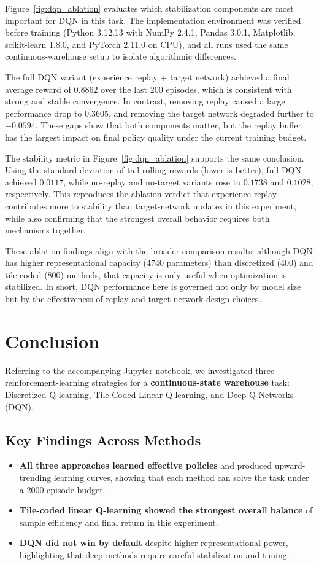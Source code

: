 \documentclass[10pt,twocolumn]{article}
\begin{document}
Figure~\ref{fig:dqn_ablation} evaluates which stabilization components are most important for DQN in this task. The implementation environment was verified before training (Python 3.12.13 with NumPy 2.4.1, Pandas 3.0.1, Matplotlib, scikit-learn 1.8.0, and PyTorch 2.11.0 on CPU), and all runs used the same continuous-warehouse setup to isolate algorithmic differences.

The full DQN variant (experience replay + target network) achieved a final average reward of $0.8862$ over the last 200 episodes, which is consistent with strong and stable convergence. In contrast, removing replay caused a large performance drop to $0.3605$, and removing the target network degraded further to $-0.0594$. These gaps show that both components matter, but the replay buffer has the largest impact on final policy quality under the current training budget.

The stability metric in Figure~\ref{fig:dqn_ablation} supports the same conclusion. Using the standard deviation of tail rolling rewards (lower is better), full DQN achieved $0.0117$, while no-replay and no-target variants rose to $0.1738$ and $0.1028$, respectively. This reproduces the ablation verdict that experience replay contributes more to stability than target-network updates in this experiment, while also confirming that the strongest overall behavior requires both mechanisms together.

These ablation findings align with the broader comparison results: although DQN has higher representational capacity (4740 parameters) than discretized (400) and tile-coded (800) methods, that capacity is only useful when optimization is stabilized. In short, DQN performance here is governed not only by model size but by the effectiveness of replay and target-network design choices.

\section{Conclusion}

Referring to the accompanying Jupyter notebook, we investigated three reinforcement-learning strategies for a \textbf{continuous-state warehouse} task: Discretized Q-learning, Tile-Coded Linear Q-learning, and Deep Q-Networks (DQN).

\subsection*{Key Findings Across Methods}
\begin{itemize}
\item \textbf{All three approaches learned effective policies} and produced upward-trending learning curves, showing that each method can solve the task under a 2000-episode budget.
\item \textbf{Tile-coded linear Q-learning showed the strongest overall balance} of sample efficiency and final return in this experiment.
\item \textbf{DQN did not win by default} despite higher representational power, highlighting that deep methods require careful stabilization and tuning.
\end{itemize}
\end{document}
